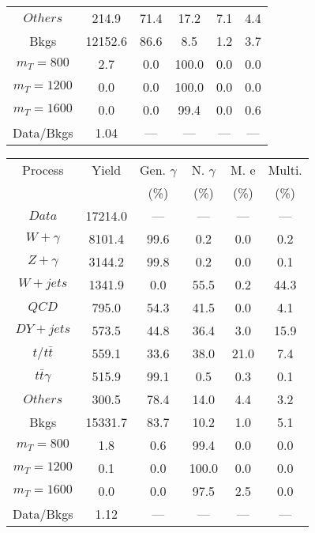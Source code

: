 \begin{figure}
\begin{minipage}[c]{0.32\textwidth}
{\begin{tabular}{cccccc}
$ Others $ &  214.9 &  71.4 &  17.2 &  7.1 &  4.4\\
Bkgs &  12152.6 &  86.6 &  8.5 &  1.2 &  3.7\\
$ m_{T} = 800 $ &  2.7 &  0.0 &  100.0 &  0.0 &  0.0\\
$ m_{T} = 1200 $ &  0.0 &  0.0 &  100.0 &  0.0 &  0.0\\
$ m_{T} = 1600 $ &  0.0 &  0.0 &  99.4 &  0.0 &  0.6\\
Data/Bkgs &  1.04 &  --- &  --- &  --- &  ---\\
\hline
\end{tabular}
}
\end{minipage}
\begin{minipage}[c]{0.32\textwidth}
\centering
\tiny{
\begin{tabular}{cccccc}
\hline
Process & Yield & Gen. $\gamma$ & N. $\gamma$ & M. e & Multi. \\
 &  & (\%) & (\%) & (\%) & (\%)  \\
\hline
                                                                      $ Data $ &  17214.0 &  --- &  --- &  --- &  ---\\
$ W+\gamma $ &  8101.4 &  99.6 &  0.2 &  0.0 &  0.2\\
$ Z+\gamma $ &  3144.2 &  99.8 &  0.2 &  0.0 &  0.1\\
$ W+jets $ &  1341.9 &  0.0 &  55.5 &  0.2 &  44.3\\
$ QCD $ &  795.0 &  54.3 &  41.5 &  0.0 &  4.1\\
$ DY+jets $ &  573.5 &  44.8 &  36.4 &  3.0 &  15.9\\
$ t/t\bar{t} $ &  559.1 &  33.6 &  38.0 &  21.0 &  7.4\\
$ t\bar{t}\gamma $ &  515.9 &  99.1 &  0.5 &  0.3 &  0.1\\
$ Others $ &  300.5 &  78.4 &  14.0 &  4.4 &  3.2\\
Bkgs &  15331.7 &  83.7 &  10.2 &  1.0 &  5.1\\
$ m_{T} = 800 $ &  1.8 &  0.6 &  99.4 &  0.0 &  0.0\\
$ m_{T} = 1200 $ &  0.1 &  0.0 &  100.0 &  0.0 &  0.0\\
$ m_{T} = 1600 $ &  0.0 &  0.0 &  97.5 &  2.5 &  0.0\\
Data/Bkgs &  1.12 &  --- &  --- &  --- &  ---\\
\hline
\end{tabular}
}
\end{minipage}
\begin{minipage}[c]{0.32\textwidth}
\centering

\end{minipage}
\end{figure}
